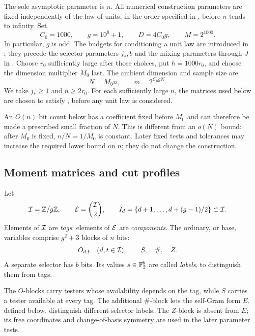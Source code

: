 The sole asymptotic parameter is \(n\). All numerical construction
parameters are fixed independently of the law of units, in the order
specified in , before \(n\) tends to infinity.
Set
\begin{equation}\label{eq:early-constants}
 C_0=1000,\qquad g=10^9+1,\qquad
 D=4C_0g,\qquad M=2^{1000}.
\end{equation}
In particular, \(g\) is odd. The budgets for conditioning a unit law
are introduced in ; they precede the selector
parameters \(j_*,b\) and the mixing parameters through \(J\) in
. Choose \(r_0\) sufficiently large after those
choices, put \(h=1000r_0\), and choose the dimension multiplier
\(M_0\) last. The ambient dimension and sample size are
\begin{equation}\label{eq:parameter-order}
 N=M_0n,\qquad m=2^{C_0gN}.
\end{equation}
We take \(j_*\ge1\) and \(n\ge2r_0\). For each sufficiently
large \(n\), the matrices used below are chosen to satisfy
, before any unit law is considered.

An \(O(n)\) bit count below has a coefficient fixed before \(M_0\)
and can therefore be made a prescribed small fraction of \(N\).
This is different from an \(o(N)\) bound: after \(M_0\) is fixed,
\(n/N=1/M_0\) is constant. Later fixed tests and tolerances may
increase the required lower bound on \(n\); they do not change the
construction.

\subsection{Moment matrices and cut profiles}

Let
\[
 \mathcal I=\mathbb Z/g\mathbb Z,\qquad
 \mathcal E=\binom{\mathcal I}{2},\qquad
 I_d=\{d+1,\ldots,d+(g-1)/2\}\subset\mathcal I .
\]
Elements of \(\mathcal I\) are \emph{tags}; elements of \(\mathcal E\) are \emph{components}.
The ordinary, or base, variables comprise \(g^2+3\) blocks of \(n\) bits:
\[
 O_{d,t}\quad(d,t\in\mathcal I),\qquad S,\quad \#,\quad Z.
\]
A separate selector has \(b\) bits.  Its values \(s\in\mathbb F_2^b\) are called \emph{labels}, to distinguish them from tags.

The \(O\)-blocks carry testers whose availability depends on the tag,
while \(S\) carries a tester available at every tag.
The additional \(\#\)-block lets the self-Gram form \(E\), defined
below, distinguish different selector labels.
The \(Z\)-block is absent from \(E\); its free coordinates and
change-of-basis symmetry are used in the later parameter tests.

